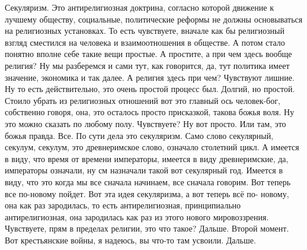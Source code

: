Секуляризм. Это антирелигиозная доктрина, согласно которой движение к лучшему
обществу, социальные, политические реформы не должны основываться на религиозных
установках. То есть чувствуете, вначале как бы религиозный взгляд сместился на
человека и взаимоотношения в обществе. А потом стало понятно вполне себе такие
вещи простые. А простите, а при чем здесь вообще религия? Ну мы разберемся и
сами тут, как говорится, да, тут политика имеет значение, экономика и так далее.
А религия здесь при чем? Чувствуют лишние. Ну то есть действительно, это очень
простой процесс был. Долгий, но простой. Стоило убрать из религиозных отношений
вот это главный ось человек-бог, собственно говоря, она, это осталось просто
присказкой, такова божья воля. Ну это можно сказать по любому полу. Чувствуете?
Ну вот просто. Или там, это божья правда. Все. По сути дела это секуляризм. Само
слово секулярный, секулум, секулум, это древнеримское слово, означало столетний
цикл. А имеется в виду, что время от времени императоры, имеется в виду
древнеримские, да, императоры означали, ну см назначали такой вот секулярный
год. Имеется в виду, что это когда мы все сначала начинаем, все сначала говорим.
Вот теперь все по-новому пойдет. Вот эта идея секуляризма, а вот теперь всё по-
новому, она как раз зародилась, то есть антирелигиозная, принципиально
антирелигиозная, она зародилась как раз из этого нового мировоззрения.
Чувствуете, прям в пределах религии, это что такое? Дальше. Второй момент. Вот
крестьянские войны, я надеюсь, вы что-то там усвоили. Дальше. 

